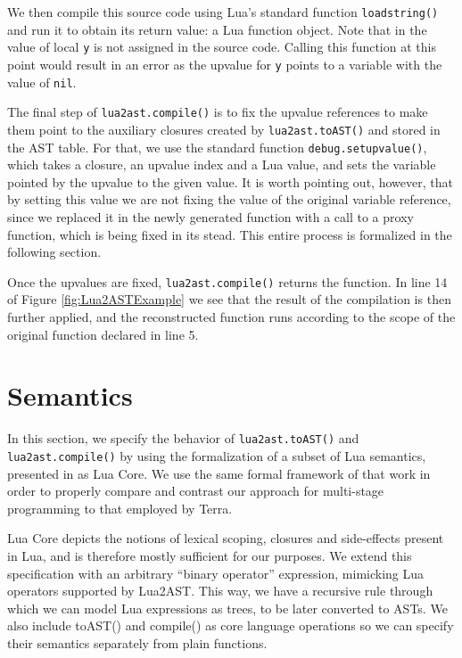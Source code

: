 \documentclass[english]{llncs}
\begin{document}
We then compile this source code using Lua's standard function
\texttt{loadstring()} and run it to obtain its return value: a Lua function object.
Note that in the value of local \texttt{y} is not assigned
in the source code. Calling this function at this point would result
in an error as the upvalue for \texttt{y} points to a variable with
the value of \texttt{nil}.

The final step of \texttt{lua2ast.compile()} is to fix the upvalue
references to make them point to the auxiliary closures created by
\texttt{lua2ast.toAST()} and stored in the AST table.
For that, we use the standard function \texttt{debug.setupvalue()},
which takes a closure, an upvalue index and a Lua value, and sets
the variable pointed by the upvalue to the given value.
It is worth pointing out, however, that by setting this value we are not fixing the value
of the original variable reference, since we replaced it in the newly generated function
with a call to a proxy function, which is being fixed in its stead.
This entire process is formalized in the following section.

Once the upvalues are fixed, \texttt{lua2ast.compile()} returns the
function. In line 14 of Figure \ref{fig:Lua2ASTExample} we see
that the result of the compilation is then further applied,
and the reconstructed function runs according to the scope of the
original function declared in line 5.

\section{Semantics}
\label{sec:semantics}

In this section, we specify the behavior of \texttt{lua2ast.toAST()}
and \texttt{lua2ast.compile()} by using the formalization of a subset
of Lua semantics, presented in \cite{DeVito2013Terra} as Lua Core.
We use the same formal framework of that work in order to properly
compare and contrast our approach for multi-stage programming to that
employed by Terra.

Lua Core depicts the notions of lexical scoping, closures and side-effects
present in Lua, and is therefore mostly sufficient for our purposes.
We extend this specification with an arbitrary ``binary operator''
expression, mimicking Lua operators supported by Lua2AST. This way,
we have a recursive rule through which we can model Lua expressions
as trees, to be later converted to ASTs. We also include toAST() and
compile() as core language operations so we can specify their semantics
separately from plain functions.
\end{document}
